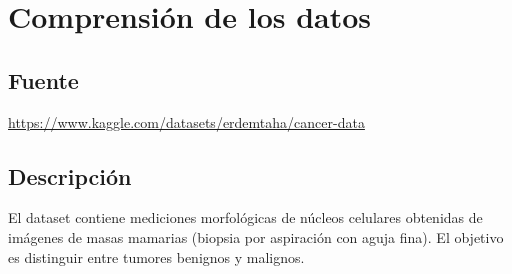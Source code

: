 \section{Comprensión de los datos}

\subsection{Fuente}
\url{https://www.kaggle.com/datasets/erdemtaha/cancer-data}

\subsection{Descripción}
El dataset contiene mediciones morfológicas de núcleos celulares obtenidas de imágenes de masas mamarias (biopsia por aspiración con aguja fina). El objetivo es distinguir entre tumores benignos y malignos.

